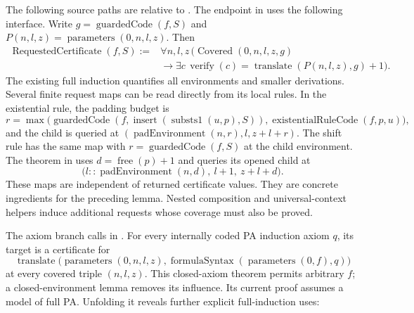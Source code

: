 The following source paths are relative to
.
The endpoint  in
 uses the following interface.
Write $g=\operatorname{guardedCode}(f,S)$ and
$P(n,l,z)=\operatorname{parameters}(0,n,l,z)$. Then
\[
\begin{aligned}
 \operatorname{RequestedCertificate}(f,S):={}&
 \forall n,l,z\,\bigl(\operatorname{Covered}(0,n,l,z,g)\\
 &\to \exists c\,
  \operatorname{verify}(c)=\operatorname{translate}(P(n,l,z),g)+1\bigr).
\end{aligned}
\]
The existing full induction quantifies all environments and smaller
derivations. Several finite request maps can be read directly from its
local rules. In the existential rule, the padding budget is
\[
 r=\max\bigl(\operatorname{guardedCode}
      (f,\operatorname{insert}(\operatorname{substs1}(u,p),S)),
      \operatorname{existentialRuleCode}(f,p,u)\bigr),
\]
and the child is queried at
$(\operatorname{padEnvironment}(n,r),l,z+l+r)$.
The shift rule has the same map with
$r=\operatorname{guardedCode}(f,S)$ at the child environment.
The theorem  in
 uses
$d=\operatorname{free}(p)+1$ and queries its opened child at
\[
 \bigl(l::\operatorname{padEnvironment}(n,d),\ l+1,\ z+l+d\bigr).
\]
These maps are independent of returned certificate values. They are
concrete ingredients for the preceding lemma. Nested composition and
universal-context helpers induce additional requests whose coverage
must also be proved.

The axiom branch calls
 in
. For every internally
coded PA induction axiom $q$, its target is a certificate for
\[
 \operatorname{translate}\bigl(\operatorname{parameters}(0,n,l,z),
       \operatorname{formulaSyntax}(\operatorname{parameters}(0,f),q)
                         \bigr)
\]
at every covered triple $(n,l,z)$. This closed-axiom theorem permits
arbitrary $f$; a closed-environment lemma removes its influence.
Its current proof assumes a model of full PA. Unfolding it reveals
further explicit full-induction uses:

